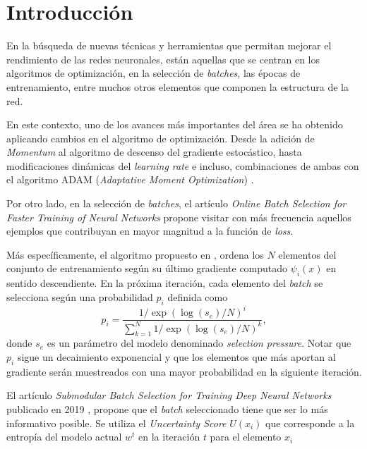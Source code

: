 \section{Introducción}

En la búsqueda de nuevas técnicas y herramientas que permitan mejorar el rendimiento de las redes neuronales, están aquellas que se centran en los algoritmos de optimización, en la selección de \textit{batches}, las épocas de entrenamiento, entre muchos otros elementos que componen la estructura de la red. 

\vspace{0.2cm}

En este contexto, uno de los avances más importantes del área se ha obtenido aplicando cambios en el algoritmo de optimización. Desde la adición de \textit{Momentum} al algoritmo de descenso del gradiente estocástico, hasta modificaciones dinámicas del \textit{learning rate} e incluso, combinaciones de ambas con el algoritmo ADAM (\textit{Adaptative Moment Optimization}) \cite{https://doi.org/10.48550/arxiv.1412.6980}.

\vspace{0.2cm}

Por otro lado, en la selección de \textit{batches}, el artículo \textit{Online Batch Selection for Faster Training of Neural Networks} \cite{https://doi.org/10.48550/arxiv.1511.06343} propone visitar con más frecuencia aquellos ejemplos que contribuyan en mayor magnitud a la función de \textit{loss}.
 
\vspace{0.2cm}

Más específicamente, el algoritmo propuesto en \cite{https://doi.org/10.48550/arxiv.1511.06343}, ordena los $N$ elementos del conjunto de entrenamiento según su último gradiente computado $\psi_i(x)$ en sentido descendiente. En la próxima iteración, cada elemento del \textit{batch} se selecciona según una probabilidad $p_i$ definida como 
\[
p_i = \frac{1/\exp(\log(s_e)/N)^{i}}{\sum_{k=1}^N 1/\exp(\log(s_e)/N)^{k}} ,
\] donde $s_e$ es un parámetro del modelo denominado \textit{selection pressure}. Notar que $p_i$ sigue un decaimiento exponencial y que los elementos que más aportan al gradiente serán muestreados con una mayor probabilidad en la siguiente iteración. 

\vspace{0.2cm}

El artículo \textit{Submodular Batch Selection for Training Deep Neural Networks} publicado en 2019 \cite{ijcai2019p372}, propone que el \textit{batch} seleccionado tiene que ser lo más informativo posible. Se utiliza el \textit{Uncertainty Score} $U(x_i)$ que corresponde a la entropía del modelo actual $w^t$ en la iteración $t$ para el elemento $x_i$

